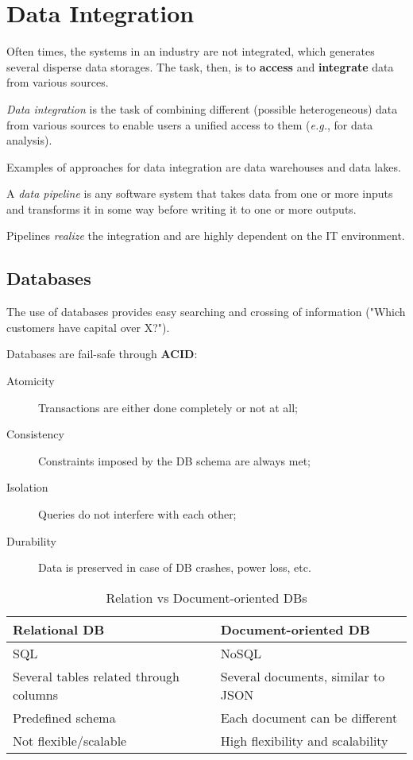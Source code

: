 \documentclass[a4paper]{report}
\begin{document}
\section*{Data Integration}

Often times, the systems in an industry are not integrated, which generates several disperse data storages. The task, then, is to \textbf{access} and \textbf{integrate} data from various sources.

\begin{definition}
    \emph{Data integration} is the task of combining different (possible heterogeneous) data from various sources to enable users a unified access to them (\emph{e.g.}, for data analysis).
\end{definition}

Examples of approaches for data integration are data warehouses and data lakes.

\begin{definition}
    A \emph{data pipeline} is any software system that takes data from one or more inputs and transforms it in some way before writing it to one or more outputs.
\end{definition}

Pipelines \emph{realize} the integration and are highly dependent on the IT environment.

\subsection*{Databases}

The use of databases provides easy searching and crossing of information ("Which customers have capital over X?").

Databases are fail-safe through \textbf{ACID}:

\begin{description}
    \item[Atomicity] Transactions are either done completely or not at all;
    \item[Consistency] Constraints imposed by the DB schema are always met;
    \item[Isolation] Queries do not interfere with each other;
    \item[Durability] Data is preserved in case of DB crashes, power loss, etc.
\end{description}

\begin{table}[H]
    \centering
    \caption{Relation vs Document-oriented DBs}
    \label{tab:nosql-tables-comparison}
    \begin{tabular}{l l}
    \toprule
    Relational DB & Document-oriented DB \\
    \midrule
    SQL & NoSQL \\
    Several tables related through columns & Several documents, similar to JSON \\
    Predefined schema & Each document can be different \\
    Not flexible/scalable & High flexibility and scalability \\
    \bottomrule
    \end{tabular}
\end{table}
\end{document}
